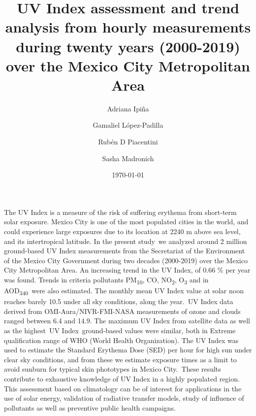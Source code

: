 \documentclass[10pt]{article}
\renewenvironment{abstract}
  {{\bfseries\noindent{\abstractname}\par\nobreak}\footnotesize}
  {\bigskip}
\begin{document}
\title{UV Index assessment and trend analysis from hourly 
measurements during twenty years (2000-2019) over the Mexico City Metropolitan Area}


\author[1]{Adriana Ipiña}%
\author[2]{Gamaliel López-Padilla}%
\author[1]{Rubén D Piacentini}%
\author[3]{Sasha Madronich}
%


\vspace{-1em}



  \date{\today}


\begingroup
\let\center\flushleft
\let\endcenter\endflushleft
\maketitle
\endgroup





\begin{abstract}
The UV Index is a measure of the risk of suffering erythema from
short-term solar exposure. Mexico City is one of the most populated
cities in the world, and could experience large exposures due to its
location at 2240 m above sea level, and its intertropical latitude. In
the present study~we analyzed around 2 million ground-based UV Index
measurements from the Secretariat of the Environment of the Mexico City
Government during two decades (2000-2019) over the Mexico City
Metropolitan Area. An increasing trend in the UV Index, of 0.66 \% per
year was found. Trends in criteria pollutants PM\textsubscript{10}, CO,
NO\textsubscript{2}, O\textsubscript{3} and in
AOD\textsubscript{340}~were also estimated. The monthly mean UV Index
value at solar noon reaches barely 10.5 under all sky conditions, along
the year.~UV Index data derived from OMI-Aura/NIVR-FMI-NASA measurements
of ozone and clouds ranged between 6.4 and 14.9. The maximum UV Index
from satellite data as well as the highest~UV Index~ground-based values
were similar, both in Extreme qualification range of WHO (World Health
Organization). The UV Index was used to estimate the Standard Erythema
Dose (SED) per hour for high sun under clear sky conditions, and from
these we estimate exposure times as a limit to avoid sunburn for typical
skin phototypes in Mexico City.~These results contribute to exhaustive
knowledge of UV Index in a highly populated region. This assessment
based on climatology can be of interest for applications in the use of
solar energy, validation of radiative transfer models, study of
influence of pollutants as well as preventive public health campaigns.%
\end{abstract}%
\end{document}
